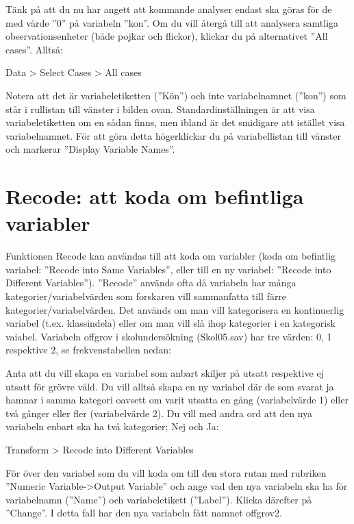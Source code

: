 \documentclass[
]{book}
\begin{document}
Tänk på att du nu har angett att kommande analyser endast ska göras för de med värde ''0'' på
variabeln ''kon''. Om du vill återgå till att analysera samtliga observationsenheter (både pojkar och
flickor), klickar du på alternativet ''All cases''. Alltså:

Data \textgreater{} Select Cases \textgreater{} All cases

Notera att det är variabeletiketten (''Kön'') och inte variabelnamnet (''kon'') som står i rullistan till
vänster i bilden ovan. Standardinställningen är att visa variabeletiketten om en sådan finns, men
ibland är det smidigare att istället visa variabelnamnet. För att göra detta högerklickar du på
variabellistan till vänster och markerar ''Display Variable Names''.

\hypertarget{recode-att-koda-om-befintliga-variabler}{%
\section{Recode: att koda om befintliga variabler}\label{recode-att-koda-om-befintliga-variabler}}

Funktionen Recode kan användas till att koda om variabler (koda om befintlig variabel: ''Recode into
Same Variables'', eller till en ny variabel: ''Recode into Different Variables''). ''Recode'' används ofta då
variabeln har många kategorier/variabelvärden som forskaren vill sammanfatta till färre
kategorier/variabelvärden. Det används om man vill kategorisera en kontinuerlig variabel (t.ex.
klassindela) eller om man vill slå ihop kategorier i en kategorisk vaiabel. Variabeln offgrov i
skolundersökning (Skol05.sav) har tre värden: 0, 1 respektive 2, se frekvenstabellen nedan:

Anta att du vill skapa en variabel som anbart skiljer på utsatt respektive ej utsatt för grövre våld. Du vill
alltså skapa en ny variabel där de som svarat ja hamnar i samma kategori oavsett om varit utsatta en
gång (variabelvärde 1) eller två gånger eller fler (variabelvärde 2). Du vill med andra ord att den nya
variabeln enbart ska ha två kategorier; Nej och Ja:

Transform \textgreater{} Recode into Different Variables

För över den variabel som du vill koda om till den stora rutan med rubriken ''Numeric Variable-\textgreater Output
Variable'' och ange vad den nya variabeln ska ha för variabelnamn (''Name'') och variabeletikett
(''Label''). Klicka därefter på ''Change''. I detta fall har den nya variabeln fått namnet offgrov2.
\end{document}

